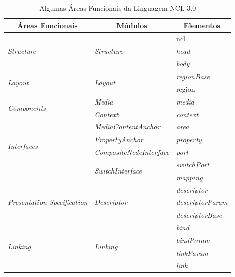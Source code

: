 \begin{table}[!ht]  \footnotesize
\caption{Algumas Áreas Funcionais da Linguagem NCL 3.0
\label{tab:areasFuncionais}
\cite{soares2009programando}}
\centering
{
  \renewcommand\arraystretch{1.0}
  \begin{tabular}{|p{4.5cm}|p{6cm}|p{4cm}|} \hline
   \multicolumn{1}{|c|}{Áreas Funcionais} & \multicolumn{1}{c|}{Módulos} & \multicolumn{1}{c|}{Elementos} \\\hline 

   \multirow{3}{*}{\textit{Structure}} & \multirow{3}{*}{\textit{Structure}} & ncl\\\cline{3-3} && \textit{head}\\\cline{3-3} && \textit{body}\\\hline

   \multirow{2}{*}{\textit{Layout}} & \multirow{2}{*}{\textit{Layout}} & \textit{regionBase}\\\cline{3-3} && region\\\hline
   \multirow{2}{*}{\textit{\textit{Components}}} & \textit{Media} & \textit{media}\\\cline{2-3} & \textit{\textit{Context}} & \textit{\textit{context}}\\\hline
   
   \multirow{4}{*}{\textit{Interfaces}} & \textit{MediaContentAnchor} & \textit{area}\\\cline{2-3}
   & \textit{PropertyAnchor} & \textit{property}\\\cline{2-3}
   & \textit{CompositeNodeInterface} & \textit{port}\\\cline{2-3}
   &\multirow{2}{*}{\textit{SwitchInterface}} & \textit{switchPort}\\\cline{3-3} && \textit{mapping} \\\hline
   
   \multirow{3}{*}{\textit{Presentation Specification}} & \multirow{3}{*}{\textit{Descriptor}} & \textit{descriptor} \\\cline{3-3} 
   && \textit{descriptorParam} \\\cline{3-3} && \textit{descriptorBase} \\\hline
   
   \multirow{4}{*}{\textit{Linking}} & \multirow{4}{*}{\textit{Linking}} & \textit{bind}\\\cline{3-3} && \textit{bindParam}\\\cline{3-3} && \textit{linkParam}\\\cline {3-3} && \textit{link}\\\hline
      

\end{tabular}}
\end{table}

